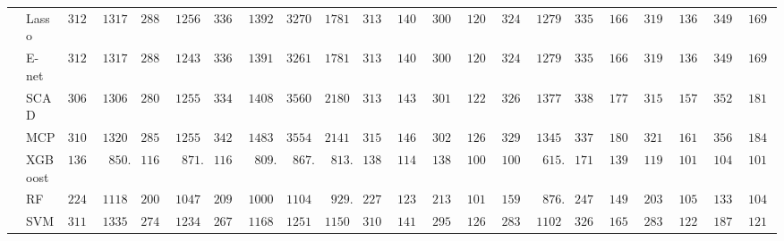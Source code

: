 \begin{tabular}{p{0.2cm}p{1cm}|p{0.6cm}p{0.6cm}|p{0.6cm}p{0.6cm}p{0.6cm}p{0.6cm}p{0.6cm}p{0.6cm}|p{0.6cm}p{0.6cm}p{0.6cm}p{0.6cm}p{0.6cm}p{0.6cm}|p{0.6cm}p{0.6cm}p{0.6cm}p{0.6cm}p{0.6cm}p{0.6cm}}
 & Lasso  & $3124.13$ & $1317.89$ & $2884.72$ & $1256.48$ & $3368.84$ & $1392.12$ & $3270.99$ & $1781.95$ & $3137.87$ & $1401.69$ & $3004.37$ & $1207.20$ & $3248.91$ & $1279.02$ & $3356.92$ & $1663.40$ & $3196.76$ & $1364.80$ & $3496.55$ & $1690.54$ \\
 & E-net  & $3126.36$ & $1317.58$ & $2881.13$ & $1243.69$ & $3368.48$ & $1391.61$ & $3261.95$ & $1781.33$ & $3137.77$ & $1400.25$ & $3004.76$ & $1207.35$ & $3249.32$ & $1279.63$ & $3353.36$ & $1661.42$ & $3197.81$ & $1366.01$ & $3495.08$ & $1690.96$ \\
 & SCAD  & $3068.49$ & $1306.88$ & $2804.71$ & $1255.80$ & $3341.16$ & $1408.84$ & $3560.15$ & $2180.05$ & $3133.93$ & $1435.10$ & $3011.23$ & $1220.56$ & $3267.35$ & $1377.43$ & $3389.09$ & $1770.02$ & $3159.79$ & $1575.78$ & $3520.36$ & $1811.26$ \\
 & MCP  & $3101.06$ & $1320.18$ & $2855.92$ & $1255.17$ & $3429.55$ & $1483.67$ & $3554.70$ & $2141.29$ & $3152.61$ & $1461.94$ & $3021.61$ & $1260.19$ & $3297.36$ & $1345.15$ & $3370.02$ & $1801.84$ & $3213.17$ & $1610.95$ & $3560.48$ & $1841.78$ \\
 & XGBoost  & $1367.70$ & $\phantom{0}850.22$ & $1167.06$ & $\phantom{0}871.49$ & $1164.46$ & $\phantom{0}809.21$ & $\phantom{0}867.68$ & $\phantom{0}813.63$ & $1387.51$ & $1147.71$ & $1386.44$ & $1002.48$ & $1004.68$ & $\phantom{0}615.20$ & $1710.75$ & $1393.73$ & $1191.70$ & $1016.53$ & $1043.00$ & $1018.88$ \\
 & RF  & $2243.56$ & $1118.57$ & $2006.92$ & $1047.67$ & $2095.75$ & $1000.91$ & $1104.69$ & $\phantom{0}929.39$ & $2274.79$ & $1234.93$ & $2136.64$ & $1013.60$ & $1594.29$ & $\phantom{0}876.68$ & $2476.77$ & $1490.61$ & $2031.75$ & $1054.92$ & $1330.42$ & $1049.45$ \\
 & SVM  & $3115.70$ & $1335.92$ & $2745.72$ & $1234.93$ & $2674.80$ & $1168.25$ & $1251.15$ & $1150.82$ & $3106.22$ & $1411.77$ & $2959.97$ & $1262.70$ & $2835.28$ & $1102.72$ & $3261.57$ & $1653.97$ & $2835.09$ & $1226.89$ & $1875.05$ & $1217.84$ \\
\hline 
\end{tabular}

